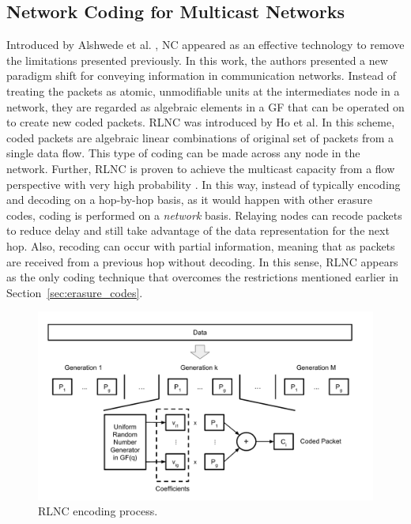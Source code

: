 \subsection{Network Coding for Multicast Networks}
Introduced by Alshwede et al. \cite{ahlswede2000network}, \ac{NC} appeared as an effective technology to remove the limitations presented previously. In this work, the authors presented a new paradigm shift for conveying information in communication networks. Instead of treating the packets as atomic, unmodifiable units at the intermediates node in a network, they are regarded as algebraic elements in a \ac{GF} that can be operated on to create new coded packets. \ac{RLNC} \cite{ho2006random} was introduced by Ho et al. In this scheme, coded packets are algebraic linear combinations of original set of packets from a single data flow. This type of coding can be made across any node in the network. Further, \ac{RLNC} is proven to achieve the multicast capacity from a flow perspective with very high probability \cite{koetter2003algebraic,ho2006random}. In this way, instead of typically encoding and decoding on a hop-by-hop basis, as it would happen with other erasure codes, coding is performed on a \textit{network} basis. Relaying nodes can recode packets to reduce delay and still take advantage of the data representation for the next hop. Also, recoding can occur with partial information, meaning that as packets are received from a previous hop without decoding. In this sense, \ac{RLNC} appears as the only coding technique that overcomes the restrictions mentioned earlier in Section~\ref{sec:erasure_codes}.

\begin{figure}[h]
  \centering
  \includegraphics[width=\textwidth]{introduction/figures/RLNC.pdf}
  \caption{RLNC encoding process.}
\label{fig:rlnc_enc}
\end{figure}

